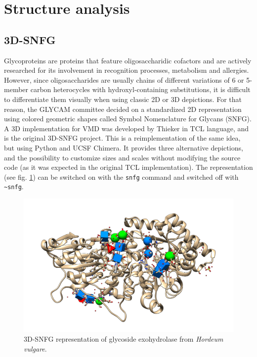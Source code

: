 \section{Structure analysis}

\subsection{3D-SNFG}
Glycoproteins are proteins that feature oligosaccharidic cofactors and are actively researched for its involvement in recognition processes, metabolism and allergies. However, since oligosaccharides are usually chains of different variations of 6 or 5-member carbon heterocycles with hydroxyl-containing substitutions, it is difficult to differentiate them visually when using classic 2D or 3D depictions. For that reason, the GLYCAM committee decided on a standardized 2D representation using colored geometric shapes called Symbol Nomenclature for Glycans (SNFG).\cite{snfg} A 3D implementation for VMD was developed by Thieker\cite{3dsnfg} in TCL language, and is the original 3D-SNFG project. This is a reimplementation of the same idea, but using Python and UCSF Chimera. It provides three alternative depictions, and the possibility to customize sizes and scales without modifying the source code (as it was expected in the original TCL implementation). The representation (see fig. \ref{fig:tangram-snfg}) can be switched on with the \texttt{snfg} command and switched off with \texttt{\textasciitilde snfg}.

\begin{figure}[t]
	\begin{Center}
		\includegraphics[width=\textwidth]{./figures/05/tangram_snfg.png}
	\end{Center}
	\cprotect\caption[Tangram 3D-SNFG]{3D-SNFG representation of glycoside exohydrolase from \textit{Hordeum vulgare}.\cite{3wlh}}
	\label{fig:tangram-snfg}
\end{figure}

